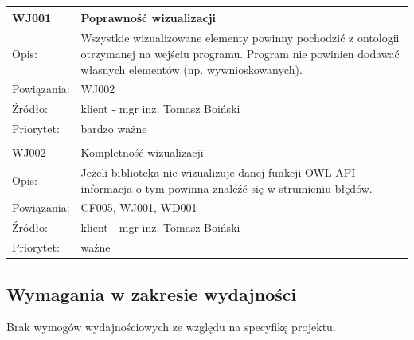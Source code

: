 \documentclass[a4paper,10pt]{article}
\begin{document}
\begin{center}

\begin{tabular}{|m{3cm}|m{9cm}|} \hline

WJ001 & Poprawność wizualizacji \\ \hline
Opis: & Wszystkie wizualizowane elementy powinny pochodzić z ontologii otrzymanej na wejściu programu. Program nie powinien dodawać własnych elementów (np. wywnioskowanych). \\ \hline
Powiązania: & WJ002 \\ \hline
Źródło: &  klient - mgr inż. Tomasz Boiński \\ \hline
Priorytet: & bardzo ważne \\ \hline

\multicolumn{2}{c}{} \\
 \hline

WJ002 & Kompletność wizualizacji \\ \hline
Opis: & Jeżeli biblioteka nie wizualizuje danej funkcji OWL API informacja o tym powinna znaleźć się w strumieniu błędów. \\ \hline
Powiązania: & CF005, WJ001, WD001 \\ \hline
Źródło: & klient - mgr inż. Tomasz Boiński \\ \hline
Priorytet: & ważne \\ \hline

\end{tabular}

\end{center}

\subsection{Wymagania w zakresie wydajności}


Brak wymogów wydajnościowych ze względu na specyfikę projektu.


\end{document}
